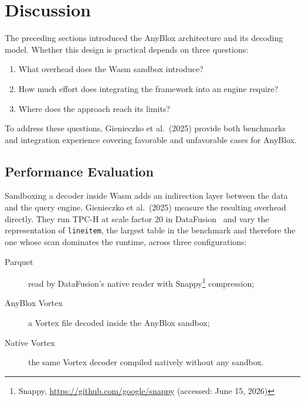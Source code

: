 \section{Discussion}

The preceding sections introduced the AnyBlox architecture and its decoding model. Whether this design is practical depends on three questions:

\begin{enumerate}
    \item What overhead does the Wasm sandbox introduce?
    \item How much effort does integrating the framework into an engine require?
    \item Where does the approach reach its limits?
\end{enumerate}

To address these questions, Gienieczko et al.\ (2025) provide both benchmarks and integration experience covering favorable and unfavorable cases for AnyBlox.

\subsection{Performance Evaluation}

Sandboxing a decoder inside Wasm adds an indirection layer between the data and the query engine. Gienieczko et al.\ (2025) measure the resulting overhead directly. They run TPC-H at scale factor 20 in DataFusion~\cite{lambApacheArrowDataFusion2024} and vary the representation of \texttt{lineitem}, the largest table in the benchmark and therefore the one whose scan dominates the runtime, across three configurations:

\begin{description}
    \item[Parquet] read by DataFusion's native reader with Snappy\footnote{Snappy, \url{https://github.com/google/snappy} (accessed: June 15, 2026)} compression;
    \item[AnyBlox Vortex] a Vortex file decoded inside the AnyBlox sandbox;
    \item[Native Vortex] the same Vortex decoder compiled natively without any sandbox.
\end{description}

